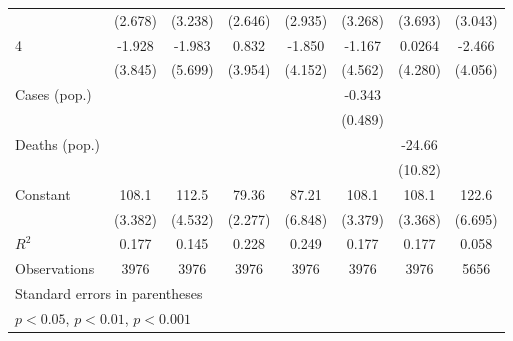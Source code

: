 \documentclass{article}
\begin{document}
{\begin{longtable}{l*{7}{c}}
                &  (2.678)         &  (3.238)         &  (2.646)         &  (2.935)         &  (3.268)         &  (3.693)         &  (3.043)         \\
4               &   -1.928         &   -1.983         &    0.832         &   -1.850         &   -1.167         &   0.0264         &   -2.466         \\
                &  (3.845)         &  (5.699)         &  (3.954)         &  (4.152)         &  (4.562)         &  (4.280)         &  (4.056)         \\
Cases (pop.)    &                  &                  &                  &                  &   -0.343         &                  &                  \\
                &                  &                  &                  &                  &  (0.489)         &                  &                  \\
Deaths (pop.)   &                  &                  &                  &                  &                  &   -24.66\sym{*}  &                  \\
                &                  &                  &                  &                  &                  &  (10.82)         &                  \\
Constant        &    108.1\sym{***}&    112.5\sym{***}&    79.36\sym{***}&    87.21\sym{***}&    108.1\sym{***}&    108.1\sym{***}&    122.6\sym{***}\\
                &  (3.382)         &  (4.532)         &  (2.277)         &  (6.848)         &  (3.379)         &  (3.368)         &  (6.695)         \\
\hline
\(R^{2}\)       &    0.177         &    0.145         &    0.228         &    0.249         &    0.177         &    0.177         &    0.058         \\
Observations    &     3976         &     3976         &     3976         &     3976         &     3976         &     3976         &     5656         \\
\hline\hline
\multicolumn{8}{l}{\footnotesize Standard errors in parentheses}\\
\multicolumn{8}{l}{\footnotesize \sym{*} \(p<0.05\), \sym{**} \(p<0.01\), \sym{***} \(p<0.001\)}\\
\end{longtable}
}
\end{document}
